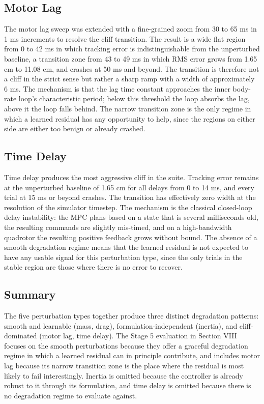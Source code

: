 \documentclass[conference]{IEEEtran}
\begin{document}
\subsection{Motor Lag}
The motor lag sweep was extended with a fine-grained zoom from 30 to 65 ms in 1 ms increments to resolve the cliff transition. The result is a wide flat region from 0 to 42 ms in which tracking error is indistinguishable from the unperturbed baseline, a transition zone from 43 to 49 ms in which RMS error grows from 1.65 cm to 11.08 cm, and crashes at 50 ms and beyond. The transition is therefore not a cliff in the strict sense but rather a sharp ramp with a width of approximately 6 ms. The mechanism is that the lag time constant approaches the inner body-rate loop's characteristic period; below this threshold the loop absorbs the lag, above it the loop falls behind. The narrow transition zone is the only regime in which a learned residual has any opportunity to help, since the regions on either side are either too benign or already crashed.

\subsection{Time Delay}
Time delay produces the most aggressive cliff in the suite. Tracking error remains at the unperturbed baseline of 1.65 cm for all delays from 0 to 14 ms, and every trial at 15 ms or beyond crashes. The transition has effectively zero width at the resolution of the simulator timestep. The mechanism is the classical closed-loop delay instability: the MPC plans based on a state that is several milliseconds old, the resulting commands are slightly mis-timed, and on a high-bandwidth quadrotor the resulting positive feedback grows without bound. The absence of a smooth degradation regime means that the learned residual is not expected to have any usable signal for this perturbation type, since the only trials in the stable region are those where there is no error to recover.

\subsection{Summary}
The five perturbation types together produce three distinct degradation patterns: smooth and learnable (mass, drag), formulation-independent (inertia), and cliff-dominated (motor lag, time delay). The Stage 5 evaluation in Section VIII focuses on the smooth perturbations because they offer a graceful degradation regime in which a learned residual can in principle contribute, and includes motor lag because its narrow transition zone is the place where the residual is most likely to fail interestingly. Inertia is omitted because the controller is already robust to it through its formulation, and time delay is omitted because there is no degradation regime to evaluate against.
\end{document}
